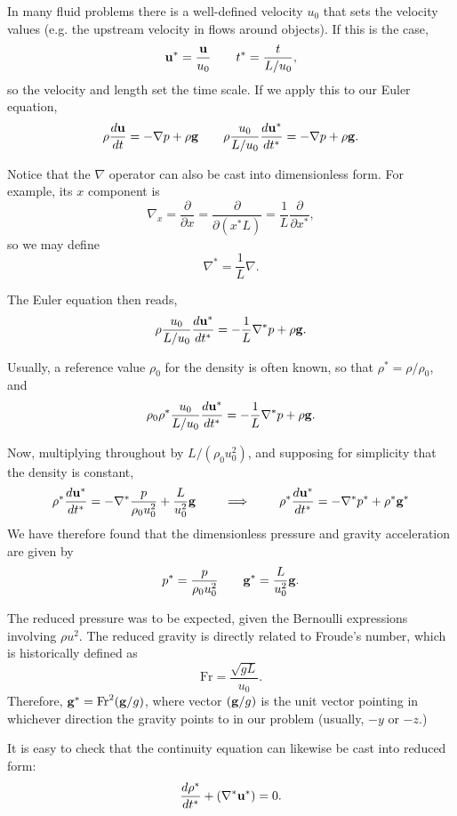 In many fluid problems there is a well-defined velocity $u_0$ that
sets the velocity values (e.g. the upstream velocity in flows around
objects). If this is the case,
\[
\mathbf{u}^* = \frac{\mathbf{u}}{u_0} \qquad
t^*=\frac{t}{L/u_0} ,
\]
so the velocity and length set the time scale. If we apply this to
our Euler equation,
\[
\rho \frac{d\mathbf{u} }{dt} =
- \nabla p 
+ \rho \mathbf{g}  \qquad
\rho \frac{u_0}{L/u_0} \frac{d\mathbf{u}^* }{dt^* } =
- \nabla p 
+ \rho \mathbf{g} .
\]

Notice that the $\nabla$ operator can also be cast into dimensionless
form. For example, its $x$ component is
\[
\nabla_x = \frac{\partial}{\partial x} = \frac{\partial}{\partial (x^* L) } =
\frac{ 1 }{ L } \frac{\partial}{\partial x^* },
\]
so we may define
\[
\nabla^* = \frac{ 1 }{ L } \nabla.
\]

The Euler equation then reads,
\[
\rho \frac{u_0}{L/u_0} \frac{d\mathbf{u}^* }{dt^* } =
- \frac{ 1 }{ L } \nabla^* p 
+ \rho \mathbf{g} .
\]

Usually, a reference value $\rho_0$ for the density is often known, so
that $\rho^* = \rho / \rho_0$, and
\[
\rho_0 \rho^* \frac{u_0}{L/u_0} \frac{d\mathbf{u}^* }{dt^* } =
- \frac{ 1 }{ L } \nabla^* p 
+ \rho \mathbf{g} .
\]


Now, multiplying throughout by $L/(\rho_0 u_0^2)$, and supposing for simplicity
that the density is constant,
\begin{equation}
  \label{eq:Euler_just_before_adim}
\rho^*
\frac{d\mathbf{u}^* }{dt^* } =
-  \nabla^* \frac{ p }{ \rho_0 u_0^2 } 
+  \frac{ L }{ u_0^2 } \mathbf{g} \qquad \implies \qquad
\rho^* \frac{d\mathbf{u}^* }{dt^* } =
-  \nabla^* p^*
+  \rho^* \mathbf{g}^* 
\end{equation}
We have therefore found that the dimensionless pressure and gravity
acceleration are given by
\[
p^*= \frac{ p }{ \rho_0 u_0^2 } \qquad
\mathbf{g}^* = \frac{ L }{ u_0^2 } \mathbf{g} .
\]

The reduced pressure was to be expected, given the Bernoulli
expressions involving $\rho u^2$. The reduced gravity is directly
related to Froude's number, which is historically defined as
\[
\mathrm{Fr}=\frac{ \sqrt{gL}}{u_0}.
\]
Therefore, $ \mathbf{g}^* = \mathrm{Fr}^2 (\mathbf{g}/g) $, where vector $(\mathbf{g}/g)
$ is the unit vector pointing in whichever direction the gravity
points to in our problem (usually, $-y$ or $-z$.)


It is easy to check that the continuity equation can likewise be
cast into reduced form:
\[
\frac{d\rho^* }{dt^* }+
 ( \nabla^* \mathbf{u}^*) = 0 .
\]
